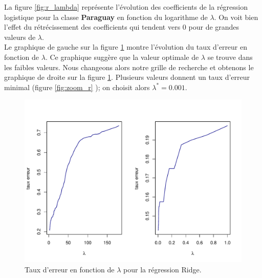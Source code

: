 \documentclass[12pt,a4paper]{article}
\begin{document}
La figure \ref{fig:r_lambda} représente l'évolution des coefficients de la
régression logistique pour la classe \textbf{Paraguay} en fonction du
logarithme de $\lambda$. On voit bien l'effet du rétrécissement des
coefficients qui tendent vers 0 pour de grandes valeurs de $\lambda$.\\
Le graphique de gauche sur la figure \ref{fig:r_lopt} montre l'évolution du
taux d'erreur en fonction de $\lambda$. Ce graphique suggère que la valeur
optimale de $\lambda$ se trouve dans les faibles valeurs. Nous changeons alors
notre grille de recherche et obtenons le graphique de droite sur la figure
\ref{fig:r_lopt}. Plusieurs valeurs donnent un taux d'erreur minimal (figure
\ref{fig:zoom_r} ); on choisit alors $\lambda^* = 0.001$.\vspace{2mm}

\begin{figure}[h!]
	\begin{center}
		\includegraphics[scale=0.7]{figures/r_lopt.pdf}
		\caption{Taux d'erreur en fonction de $\lambda$ pour la régression Ridge.}
		\label{fig:r_lopt}
	\end{center}
\end{figure}
\end{document}
